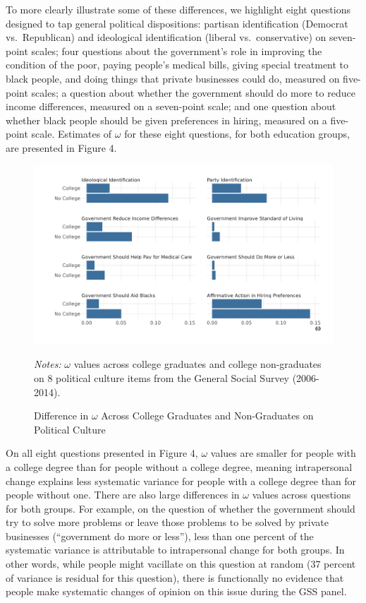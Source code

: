 \documentclass[
  12pt,
]{article}
\begin{document}
To more clearly illustrate some of these differences, we highlight eight
questions designed to tap general political dispositions: partisan
identification (Democrat vs.~Republican) and ideological identification
(liberal vs.~conservative) on seven-point scales; four questions about
the government's role in improving the condition of the poor, paying
people's medical bills, giving special treatment to black people, and
doing things that private businesses could do, measured on five-point
scales; a question about whether the government should do more to reduce
income differences, measured on a seven-point scale; and one question
about whether black people should be given preferences in hiring,
measured on a five-point scale. Estimates of \(\omega\) for these eight
questions, for both education groups, are presented in Figure 4.

\begin{figure}[hbt]
\begin{center}
\caption{Difference in $\omega$ Across College Graduates and Non-Graduates on Political Culture}

\includegraphics[width=450px]{../figures/figure_4}

\end{center}
\footnotesize{\textit{Notes:} $\omega$ values across college graduates and college non-graduates on 8 political culture items from the General Social Survey (2006-2014).}
\end{figure}

On all eight questions presented in Figure 4, \(\omega\) values are
smaller for people with a college degree than for people without a
college degree, meaning intrapersonal change explains less systematic
variance for people with a college degree than for people without one.
There are also large differences in \(\omega\) values across questions
for both groups. For example, on the question of whether the government
should try to solve more problems or leave those problems to be solved
by private businesses (``government do more or less''), less than one
percent of the systematic variance is attributable to intrapersonal
change for both groups. In other words, while people might vacillate on
this question at random (37 percent of variance is residual for this
question), there is functionally no evidence that people make systematic
changes of opinion on this issue during the GSS panel.
\end{document}

